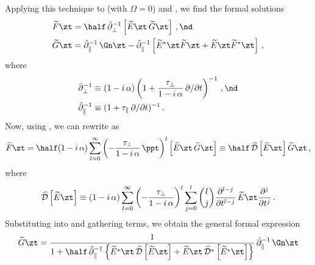 Applying this technique to  (with $\Omega = 0$) and , we find the formal solutions
\begin{subequations}%
\begin{align}
\widetilde{F}\zt &= \half\, \hat{\partial}_\perp^{-1} \left[\widetilde{E}\zt\, \widetilde{G}\zt\right]\, , \nd \\
\widetilde{G}\zt &= \hat{\partial}_\parallel^{-1}\, \Gn\zt - \hat{\partial}_\parallel^{-1} \left[ \widetilde{E}^\ast\zt \widetilde{F}\zt + \widetilde{E}\zt \widetilde{F}^\ast\zt \right]\, ,
\end{align}
\end{subequations}
where
\begin{subequations}
    \begin{align}
        \hat{\partial}_\perp^{-1} &\equiv (1 - i\, \alpha) \left(1 + \frac{\tau_\perp}{1 - i\, \alpha}\, \partial/\partial t\right)^{-1}\, ,\nd \\
        \hat{\partial}_\parallel^{-1} &\equiv (1 + \tau_\parallel\, \partial/\partial t)^{-1}\, .
    \end{align}
\end{subequations}
Now, using , we can rewrite  as
\begin{equation} \label{eqn:mfl_formal_f_deg}
    \widetilde{F}\zt = \half (1 - i\, \alpha) \sum_{l = 0}^\infty \left(- \frac{\tau_\perp}{1 - i\, \alpha}\,  \ppt \right)^l \left[\widetilde{E}\zt\, \widetilde{G}\zt\right] \equiv \half\, \widehat{\mathcal{D}}\left[\widetilde{E}\zt\right] \widetilde{G}\zt\, ,
\end{equation}
where
\begin{equation}
    \widehat{\mathcal{D}}\left[\widetilde{E}\zt\right] \equiv (1 - i\, \alpha) \sum_{l = 0}^\infty \left(-\frac{\tau_\perp}{1 - i\, \alpha}\right)^l \sum_{j = 0}^l \binom{l}{j} \frac{\partial^{l - j}}{\partial t^{l - j}}\, \widetilde{E}\zt \frac{\partial^j}{\partial t^j}\, .
\end{equation}
Substituting  into  and gathering terms, we obtain the general formal expression
\begin{equation}
    \widetilde{G}\zt = \frac{1}{1 + \half\, \hat{\partial}_\parallel^{-1} \left\{ \widetilde{E}^\ast\zt\, \widehat{\mathcal{D}}\left[\widetilde{E}\zt\right] + \widetilde{E}\zt\, \widehat{\mathcal{D}}^\ast\left[\widetilde{E}^\ast\zt\right]\right\} }\, \hat{\partial}_\parallel^{-1}\, \Gn\zt
\end{equation}
